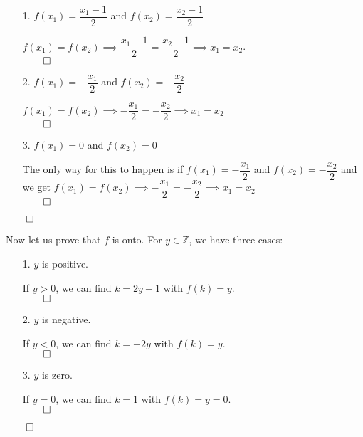 \documentclass[11pt]{article}
\newcommand{\ints}{\mathbb{Z}}
\begin{document}
\begin{itemize}
\begin{itemize}
            \begin{itemize}
                \item[1.]
                    $f(x_1) = \dfrac{x_1 - 1}{2}$ and $f(x_2) =
                    \dfrac{x_2 - 1}{2}$

                    $f(x_1) = f(x_2) \implies \dfrac{x_1 - 1}{2} =
                    \dfrac{x_2 - 1}{2} \implies x_1 = x_2$.\\
                    $\qed$

                \item[2.]
                    $f(x_1) = -\dfrac{x_1}{2}$ and $f(x_2) = -\dfrac{x_2}{2}$

                    $f(x_1) = f(x_2) \implies -\dfrac{x_1}{2} = -\dfrac{x_2}{2}
                    \implies x_1 = x_2$\\
                    $\qed$

                \item[3.]
                    $f(x_1) = 0$ and $f(x_2) = 0$

                    The only way for this to happen is if $f(x_1) =
                    -\dfrac{x_1}{2}$ and $f(x_2) = -\dfrac{x_2}{2}$ and we get
                    $f(x_1) = f(x_2) \implies -\dfrac{x_1}{2} = -\dfrac{x_2}{2}
                    \implies x_1 = x_2$\\
                    $\qed$
            \end{itemize}
            $\qed$

            Now let us prove that $f$ is onto. For $y \in \ints$, we have
            three cases:

            \begin{itemize}
                \item[1.]
                    $y$ is positive.

                    If $y > 0$, we can find $k = 2y + 1$ with $f(k) = y$.\\
                    $\qed$

                \item[2.]
                    $y$ is negative.

                    If $y < 0$, we can find $k = -2y$ with $f(k) = y$.\\
                    $\qed$

                \item[3.]
                    $y$ is zero.

                    If $y = 0$, we can find $k = 1$ with $f(k) = y = 0$.\\
                    $\qed$
            \end{itemize}
            $\qed$


\end{itemize}
\end{itemize}
\end{document}
